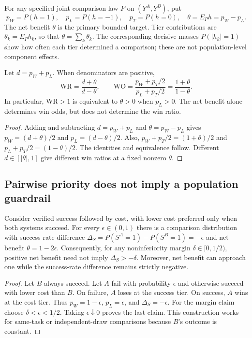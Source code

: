For any specified joint comparison law $P$ on $(Y^A,Y^B)$, put
\[
 p_W=P(h=1),\quad p_L=P(h=-1),\quad p_T=P(h=0),\quad
 \theta=E_P h=p_W-p_L.
\]
The net benefit $\theta$ is the primary bounded target. Tier contributions
are $\theta_k=E_P h_k$, so that $\theta=\sum_k\theta_k$. The corresponding
decisive masses $P(|h_k|=1)$ show how often each tier determined a
comparison; these are not population-level component effects.

\begin{proposition}\label{prop:win_relations}
Let $d=p_W+p_L$. When denominators are positive,
\[
 \mathrm{WR}=\frac{d+\theta}{d-\theta},\qquad
 \mathrm{WO}=\frac{p_W+p_T/2}{p_L+p_T/2}
             =\frac{1+\theta}{1-\theta}.
\]
In particular, $\mathrm{WR}>1$ is equivalent to $\theta>0$ when $p_L>0$.
The net benefit alone determines win odds, but does not determine the win
ratio.
\end{proposition}
\begin{proof}
Adding and subtracting $d=p_W+p_L$ and $\theta=p_W-p_L$ gives
$p_W=(d+\theta)/2$ and $p_L=(d-\theta)/2$. Also,
$p_W+p_T/2=(1+\theta)/2$ and $p_L+p_T/2=(1-\theta)/2$.
The identities and equivalence follow. Different $d\in[|\theta|,1]$
give different win ratios at a fixed nonzero $\theta$.
\end{proof}

\subsection{Pairwise priority does not imply a population guardrail}

\begin{proposition}
\label{prop:compensation}
Consider verified success followed by cost, with lower cost preferred
only when both systems succeed. For every $\epsilon\in(0,1)$ there is a
comparison distribution with success-rate difference
$\Delta_S=P(S^A=1)-P(S^B=1)=-\epsilon$ and net benefit
$\theta=1-2\epsilon$. Consequently, for any noninferiority margin
$\delta\in[0,1/2)$, positive net benefit need not imply
$\Delta_S>-\delta$. Moreover, net benefit can approach one while the
success-rate difference remains strictly negative.
\end{proposition}
\begin{proof}
Let $B$ always succeed. Let $A$ fail with probability $\epsilon$ and
otherwise succeed with lower cost than $B$. On failure, $A$ loses at the
success tier. On success, $A$ wins at the cost tier. Thus $p_W=1-\epsilon$,
$p_L=\epsilon$, and $\Delta_S=-\epsilon$. For the margin claim choose
$\delta<\epsilon<1/2$. Taking $\epsilon\downarrow0$ proves the last
claim. This construction works for same-task or independent-draw
comparisons because $B$'s outcome is constant.
\end{proof}

